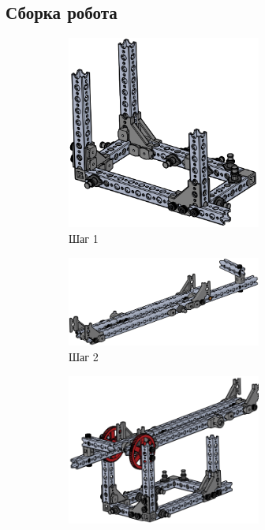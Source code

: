 \subsection{Сборка робота}
\begin{figure}[h]
    \begin{subfigure}[b]{0.45\textwidth}
        \centering
        \includegraphics[width=0.7\textwidth]{fig/assembly/2.1.png}
        \caption*{Шаг 1}
    \end{subfigure}
    \begin{subfigure}[b]{0.45\textwidth}
        \centering
        \includegraphics[width=0.7\textwidth]{fig/assembly/2.2.png}
        \caption*{Шаг 2}
    \end{subfigure}
    \begin{subfigure}[b]{0.45\textwidth}
        \centering
        \includegraphics[width=0.7\textwidth]{fig/assembly/2.3.png}

\end{subfigure}
\end{figure}
